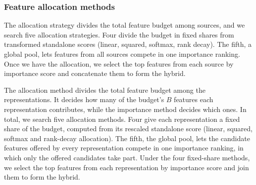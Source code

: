 \subsubsection{Feature allocation methods}

The allocation strategy divides the total feature budget among sources, and we search five allocation strategies. Four divide the budget in fixed shares from transformed standalone scores (linear, squared, softmax, rank decay). The fifth, a global pool, lets features from all sources compete in one importance ranking. Once we have the allocation, we select the top features from each source by importance score and concatenate them to form the hybrid.

The allocation method divides the total feature budget among the representations. It decides how many of the budget's $B$ features each representation contributes, while the importance method decides which ones. In total, we search five allocation methods. Four give each representation a fixed share of the budget, computed from its rescaled standalone score (linear, squared, softmax and rank-decay allocation). The fifth, the global pool, lets the candidate features offered by every representation compete in one importance ranking, in which only the offered candidates take part. Under the four fixed-share methods, we select the top features from each representation by importance score and join them to form the hybrid.





